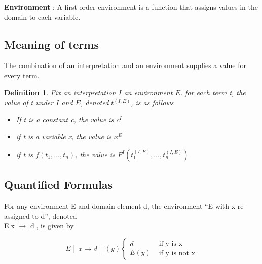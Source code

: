 \documentclass{article}
\newtheorem{definition}[theorem]{Definition}
\begin{document}
\textbf{Environment} : A first order environment is a function that assigns values in the domain to each variable. 

\subsection{Meaning of terms}
The combination of an interpretation and an environment supplies a value for every term.

\begin{definition} Fix an interpretation \(I\) an environment \(E\). for each term t, the value of t under \(I\) and \(E\), denoted \(t^{(I,E)}\), is as follows
\begin{itemize}
\item If t is a constant c, the value is \(c^I\)
\item if t is a variable x, the value is \(x^E\)
\item if t is \(f(t_1, \ldots, t_n)\), the value is \(F^I(t_1^{(I,E)} , \ldots, t_n^{(I,E)})\)
\end{itemize}
\end{definition}

\subsection{Quantified Formulas}
For any environment E and domain element d, the environment “E with x re-assigned to d”, denoted \\ E[x \(\rightarrow\) d], is given by

$$ E\begin{bmatrix}
x \rightarrow d
\end{bmatrix} (y) \begin{cases}
d \\ E(y) \end{cases} \begin{matrix}
\text{ if y is x} \\ \text{ if y is not x} 
\end{matrix} $$
\end{document}
